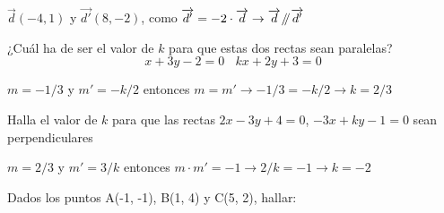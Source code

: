 \documentclass[spanish, 11pt]{exam}
\newcommand{\samedir}{\mathbin{\!/\mkern-5mu/\!}}
\begin{document}
\begin{questions}
\begin{solution} $\overrightarrow{d}(-4,1)$ y $\overrightarrow{d'}(8,-2)$, como $\overrightarrow{d'}=-2\cdot\overrightarrow{d} \to \overrightarrow{d}\samedir\overrightarrow{d'}$  \end{solution}

\question ¿Cuál ha de ser el valor de $k$ para que estas dos rectas sean paralelas? $$x + 3y -2 = 0 \ \ \ \  kx + 2y + 3 = 0$$ 
\begin{solution} $m=-1/3$ y $m'=-k/2$ entonces $m=m' \to -1/3=-k/2 \to k=2/3$ \end{solution}

\question Halla el valor de $k$ para que las rectas $2x - 3y + 4 = 0 $,  $-3x + ky -1 = 0$ 
sean perpendiculares \begin{solution} $m=2/3$ y $m'=3/k$ entonces $m\cdot m'=-1 \to 2/k=-1 \to k=-2$\end{solution}



\question Dados los puntos A(-1, -1), B(1, 4) y C(5, 2), hallar: 
\begin{multicols}{2}
\end{multicols}


\end{questions}
\end{document}
